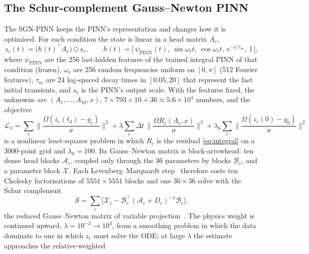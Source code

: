 \subsection{The Schur-complement Gauss--Newton PINN}
\label{sec:m-sgn}

The SGN-PINN keeps the PINN's representation and changes how it is optimised.
For each condition the state is linear in a head matrix $A_c$,
\begin{equation}
z_c(t) = \big(h(t)^{\top}A_c\big)\odot s_c,\qquad
h(t) = \big[\,\psi_{\text{PINN}}(t),\ \sin\omega_\ell t,\ \cos\omega_\ell t,\ e^{-t/\tau_m},\ 1\,\big],
\label{eq:head}
\end{equation}
where $\psi_{\text{PINN}}$ are the 256 last-hidden features of the trained
integral PINN of that condition (frozen), $\omega_\ell$ are 256 random
frequencies uniform on $[0,\pi]$ (512 Fourier features), $\tau_m$ are 24
log-spaced decay times in $[0.05,20]$ that represent the fast initial
transients, and $s_c$ is the PINN's output scale. With the features fixed, the
unknowns are $(A_1,\dots,A_{10},x)$, $7\times793\times10+36\approx5.6\times10^4$
numbers, and the objective
\begin{equation}
\mathcal{L}_\lambda = \sum_c \Big\|\frac{\Omega(z_c(t_d)-y_c)}{\sigma}\Big\|^2
+ \lambda\sum_c\Delta t\,\Big\|\frac{\Omega R_c(A_c,x)}{\sigma}\Big\|^2
+ \lambda_{0}\sum_c\Big\|\frac{\Omega(z_c(0)-y_0)}{\sigma}\Big\|^2
\label{eq:sgn}
\end{equation}
is a nonlinear least-squares problem in which $R_c$ is the residual
\eqref{eq:integral} on a 3000-point grid and $\lambda_0=100$. Its Gauss--Newton
matrix is block-arrowhead: ten dense head blocks $\mathcal{A}_c$, coupled only
through the 36 parameters by blocks $\mathcal{B}_c$, and a parameter block
$\mathcal{X}$. Each Levenberg--Marquardt step~\citep{levenberg1944method,marquardt1963algorithm}
therefore costs ten Cholesky factorisations of $5551\times5551$ blocks and one
$36\times36$ solve with the Schur complement
\begin{equation}
\mathcal{S} = \sum_c\big[\mathcal{X}_c - \mathcal{B}_c^{\top}(\mathcal{A}_c+D_c)^{-1}\mathcal{B}_c\big],
\label{eq:schur}
\end{equation}
the reduced Gauss--Newton matrix of variable
projection~\citep{golub1973differentiation,golub2003separable}.
The physics weight is continued upward, $\lambda = 10^{-2}\to10^{3}$, from a
smoothing problem in which the data dominate to one in which $z_c$ must solve
the ODE; at large $\lambda$ the estimate approaches the relative-weighted
